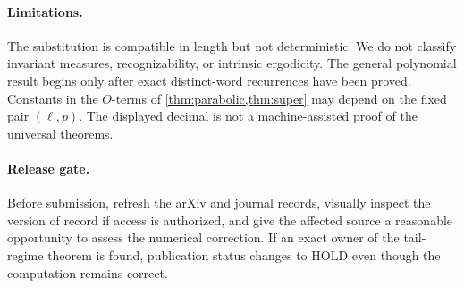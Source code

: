 \paragraph{Limitations.}
The substitution is compatible in length but not deterministic.  We do not
classify invariant measures, recognizability, or intrinsic ergodicity.  The
general polynomial result begins only after exact distinct-word recurrences
have been proved.  Constants in the $O$-terms of \cref{thm:parabolic,thm:super}
may depend on the fixed pair $(\ell,p)$.  The displayed decimal is not a
machine-assisted proof of the universal theorems.

\paragraph{Release gate.}
Before submission, refresh the arXiv and journal records, visually inspect the
version of record if access is authorized, and give the affected source a
reasonable opportunity to assess the numerical correction.  If an exact
owner of the tail-regime theorem is found, publication status changes to
HOLD even though the computation remains correct.
